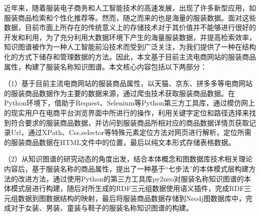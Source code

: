 \cnabstract

近年来，随着服装电子商务和人工智能技术的高速发展，出现了许多新型应用，如服装商品检索和个性化推荐等。然而，随之而来的也是海量的服装数据。面对这些数据，目前市面上所存在的传统意义上的存储技术对于其价值并不能够进行很好的开发和利用，为了充分利用大数据环境下产生的海量服装数据，并提高检索效率，知识图谱被作为一种人工智能前沿技术而受到广泛关注，为我们提供了一种在结构化的方式下储存和管理数据的方法。因此，本文基于目前主流电商网站的服装商品属性，构建了服装名称知识图谱。本文核心内容包括以下两部分：

（1）基于目前主流电商网站的服装商品属性，以天猫、京东、拼多多等电商网站的服装商品数据作为主要的数据来源，通过爬虫技术获取服装商品数据。在Python环境下，借助于Request、Selenium等Python第三方工具库，通过模仿网上的现实用户在电商平台浏览界面中所进行的操作，利用关键字定位和路径选择来找到符合要求的服装商品数据，并访问到服装商品所相对应的商品数据详情页获取记录Url，通过XPath、Css.selector等特殊元素定位方法对网页进行解析，定位所需的服装商品数据在HTML文件中的位置，最后以纯文本形式存储表格数据。

（2）从知识图谱的研究动态的角度出发，结合本体概念和图数据库技术相关理论内容后，基于服装名称的商品属性，提出了一种基于“七步法”的本体模式层构建方法的改进方法，通过使用Python的第三方工具库py2neo对服装名称知识图谱的本体模式层进行构建，随后对所生成的RDF三元组数据使用语义插件，完成RDF三元组数据到图数据结构的映射，最后将服装商品数据存储到Neo4j图数据库中，完成对于女装、男装、童装与鞋子的服装名称知识图谱的构建。
